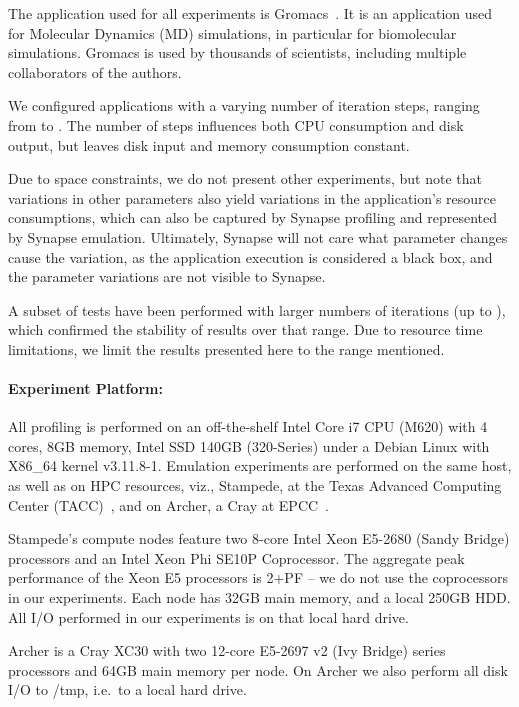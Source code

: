 \documentclass[10pt, conference, compsocconf]{IEEEtran}
\newcommand{\synapse}{Synapse\xspace}
\begin{document}
 The application used for all experiments is Gromacs~\cite{pronk2013gromacs}. It
 is an application used for Molecular Dynamics (MD) simulations, in particular
 for biomolecular simulations. Gromacs is used by
 thousands of scientists, including multiple collaborators of the
 authors. 




 We configured applications with a varying number of
 iteration steps, ranging from  to .  The number of steps influences
 both CPU consumption and disk output, but leaves disk input and memory
 consumption constant.
 
 Due to space constraints, we do not present other experiments, but note that
 variations in other parameters also yield variations in the application's
 resource consumptions, which can also be captured by \synapse profiling and
 represented by \synapse emulation.  Ultimately, \synapse will not care
 what parameter changes cause the variation, as the application execution is
 considered a black box, and the parameter variations are not visible to
 \synapse.

 A subset of tests have been performed with larger numbers of iterations (up to
 ), which confirmed the stability of results over that range.  Due to
 resource time limitations, we limit the results presented here to the range
 mentioned.

 \paragraph{Experiment Platform:} All profiling is performed on an off-the-shelf
 Intel Core i7 CPU (M620) with 4 cores, 8GB memory, Intel SSD 140GB (320-Series)
 under a Debian Linux with X86\_64 kernel v3.11.8-1.  Emulation experiments are
 performed on the same host, as well as on HPC resources, viz., Stampede, at the Texas Advanced Computing Center (TACC)~\cite{stampede_details},
 and on Archer, a Cray at EPCC~\cite{archer_details}.

 Stampede's compute nodes feature two 8-core Intel Xeon E5-2680 (Sandy
 Bridge) processors and an Intel Xeon Phi SE10P Coprocessor. The
 aggregate peak performance of the Xeon E5 processors is 2+PF -- we do
 not use the coprocessors in our experiments.  Each node has 32GB main
 memory, and a local 250GB HDD.  All I/O performed in our experiments
 is on that local hard drive.

 Archer is a Cray XC30 with two 12-core E5-2697 v2 (Ivy Bridge) series
 processors and 64GB main memory per node.  On Archer we also perform
 all disk I/O to /tmp, i.e.~to a local hard drive.
\end{document}
